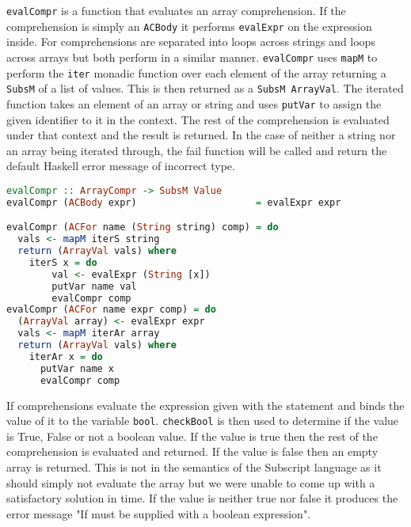 \documentclass{article}
\begin{document}
\texttt{evalCompr} is a function that evaluates an array comprehension. If the comprehension is simply an \texttt{ACBody} it performs \texttt{evalExpr} on the expression inside. For comprehensions are separated into loops across strings and loops across arrays but both perform in a similar manner. \texttt{evalCompr} uses \texttt{mapM} to perform the \texttt{iter} monadic function over each element of the array returning a \texttt{SubsM} of a list of values. This is then returned as a \texttt{SubsM ArrayVal}. The iterated function takes an element of an array or string and uses \texttt{putVar} to assign the given identifier to it in the context. The rest of the comprehension is evaluated under that context and the result is returned. In the case of neither a string nor an array being iterated through, the fail function will be called and return the default Haskell error message of incorrect type. 

\begin{lstlisting}[language=Haskell]
evalCompr :: ArrayCompr -> SubsM Value
evalCompr (ACBody expr)                     = evalExpr expr

evalCompr (ACFor name (String string) comp) = do
  vals <- mapM iterS string
  return (ArrayVal vals) where
    iterS x = do
        val <- evalExpr (String [x])
        putVar name val
        evalCompr comp
evalCompr (ACFor name expr comp) = do
  (ArrayVal array) <- evalExpr expr
  vals <- mapM iterAr array
  return (ArrayVal vals) where
    iterAr x = do
      putVar name x
      evalCompr comp

\end{lstlisting}


If comprehensions evaluate the expression given with the statement and binds the value of it to the variable \texttt{bool}. \texttt{checkBool} is then used to determine if the value is True, False or not a boolean value. If the value is true then the rest of the comprehension is evaluated and returned. If the value is false then an empty array is returned. This is not in the semantics of the Subscript language as it should simply not evaluate the array but we were unable to come up with a satisfactory solution in time. If the value is neither true nor false it produces the error message "If must be supplied with a boolean expression".     
\end{document}
